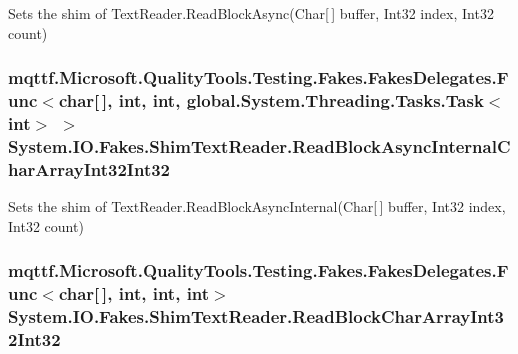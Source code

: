 Sets the shim of Text\-Reader.\-Read\-Block\-Async(\-Char\mbox{[}$\,$\mbox{]} buffer, Int32 index, Int32 count)

\hypertarget{class_system_1_1_i_o_1_1_fakes_1_1_shim_text_reader_aefb2b6e20dffecea3eff00f3e9c43c18}{
\subsubsection[{Read\-Block\-Async\-Internal\-Char\-Array\-Int32\-Int32}]{\setlength{\rightskip}{0pt plus 5cm}mqttf.\-Microsoft.\-Quality\-Tools.\-Testing.\-Fakes.\-Fakes\-Delegates.\-Func$<$char\mbox{[}$\,$\mbox{]}, int, int, global.\-System.\-Threading.\-Tasks.\-Task$<$int$>$ $>$ System.\-I\-O.\-Fakes.\-Shim\-Text\-Reader.\-Read\-Block\-Async\-Internal\-Char\-Array\-Int32\-Int32\hspace{0.3cm}{\ttfamily [set]}}}\label{class_system_1_1_i_o_1_1_fakes_1_1_shim_text_reader_aefb2b6e20dffecea3eff00f3e9c43c18}


Sets the shim of Text\-Reader.\-Read\-Block\-Async\-Internal(\-Char\mbox{[}$\,$\mbox{]} buffer, Int32 index, Int32 count)

\hypertarget{class_system_1_1_i_o_1_1_fakes_1_1_shim_text_reader_a15b8e236291d017ee0d9f1482fe3f7da}{
\subsubsection[{Read\-Block\-Char\-Array\-Int32\-Int32}]{\setlength{\rightskip}{0pt plus 5cm}mqttf.\-Microsoft.\-Quality\-Tools.\-Testing.\-Fakes.\-Fakes\-Delegates.\-Func$<$char\mbox{[}$\,$\mbox{]}, int, int, int$>$ System.\-I\-O.\-Fakes.\-Shim\-Text\-Reader.\-Read\-Block\-Char\-Array\-Int32\-Int32\hspace{0.3cm}{\ttfamily [set]}}}\label{class_system_1_1_i_o_1_1_fakes_1_1_shim_text_reader_a15b8e236291d017ee0d9f1482fe3f7da}


